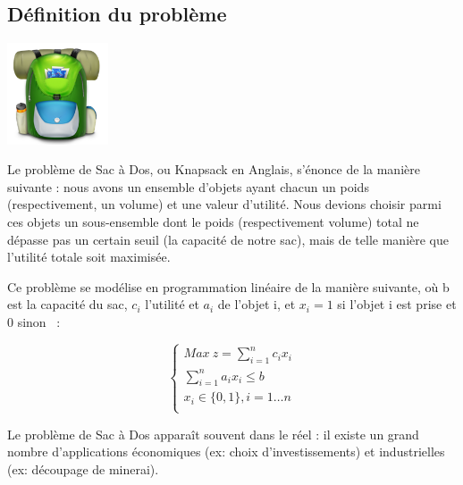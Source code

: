 \subsection{Définition du problème}

\begin{minipage}[b]{0.3\linewidth}
\centering
\includegraphics[height=3cm]{../images/Knapsack.png}
\end{minipage}
\hspace{0.5cm}
\begin{minipage}[b]{0.7\linewidth}
Le problème de Sac à Dos, ou \og Knapsack \fg{} en Anglais, s'énonce
de la manière suivante : nous avons un ensemble d'objets ayant chacun
un poids (respectivement, un volume) et une valeur d'utilité. Nous
devions choisir parmi ces objets un sous-ensemble dont le poids
(respectivement volume) total ne dépasse pas un certain seuil (la
capacité de notre sac), mais de telle manière que l'utilité totale
soit maximisée.
\end{minipage}

Ce problème se modélise en programmation linéaire de la manière
suivante, où b est la capacité du sac, $c_i$ l'utilité et $a_i$ de
l'objet i, et $x_i = 1$ si l'objet i est prise et $0$ sinon ~:

\begin{equation}
\begin{cases}
Max~z=\sum_{i=1}^nc_ix_i \\
\sum_{i=1}^na_ix_i \leq b \\
x_i \in\{0, 1\}, i=1\dots n\\
\end{cases}
\end{equation}

Le problème de Sac à Dos apparaît souvent dans le réel : il existe un
grand nombre d'applications économiques (ex: choix d'investissements)
et industrielles (ex: découpage de minerai).

